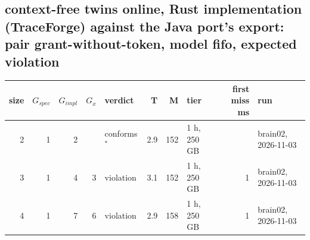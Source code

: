 \documentclass[10pt]{article}
\begin{document}
\subsection*{context-free twins online, Rust implementation (TraceForge) against the Java port's export: pair \textsf{grant-without-token}, model fifo, expected violation}
\begin{longtable}{@{}rrrrlrrlrl@{}}
\toprule
size & $G_{\mathit{spec}}$ & $G_{\mathit{impl}}$ & $G_x$ & verdict & T & M & tier & first miss ms & run \\
\midrule
\endhead
\color{red} 2 & 1 & 2 &  & conforms$^{\ast}$ & 2.9 & 152 & 1 h, 250 GB &  & brain02, 2026-11-03 \\
\color{red} 3 & 1 & 4 & 3 & violation & 3.1 & 152 & 1 h, 250 GB & 1 & brain02, 2026-11-03 \\
\color{red} 4 & 1 & 7 & 6 & violation & 2.9 & 158 & 1 h, 250 GB & 1 & brain02, 2026-11-03 \\
\bottomrule
\end{longtable}
\end{document}
